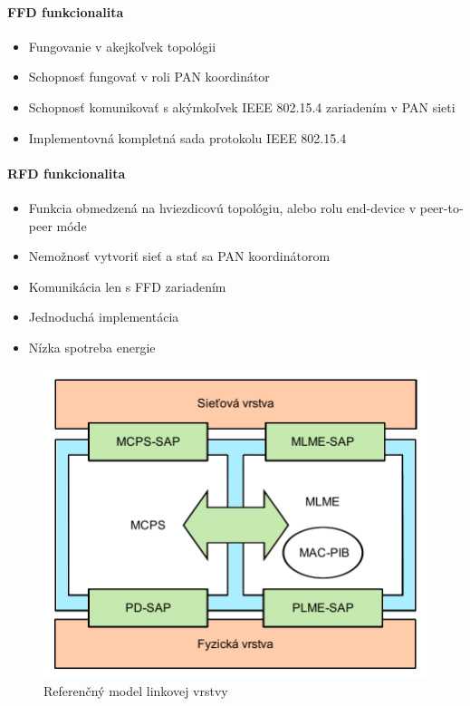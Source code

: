 \paragraph{FFD funkcionalita}
\begin{itemize}
\item Fungovanie v akejkoľvek topológii
\item Schopnosť fungovať v roli PAN koordinátor
\item Schopnosť komunikovať s akýmkoľvek IEEE 802.15.4 zariadením v PAN sieti
\item Implementovná kompletná sada protokolu IEEE 802.15.4
\end{itemize}

\paragraph{RFD funkcionalita}
\begin{itemize}
\item Funkcia obmedzená na hviezdicovú topológiu, alebo rolu end-device v peer-to-peer móde
\item Nemožnosť vytvoriť sieť a stať sa PAN koordinátorom
\item Komunikácia len s FFD zariadením
\item Jednoduchá implementácia
\item Nízka spotreba energie
\end{itemize}

\begin{figure}[htbp]
\begin{center}
\includegraphics[width=120mm]{figures/topology_mac}
\caption{Referenčný model linkovej vrstvy}
\label{fig:topology_mac}
\end{center}
\end{figure}

